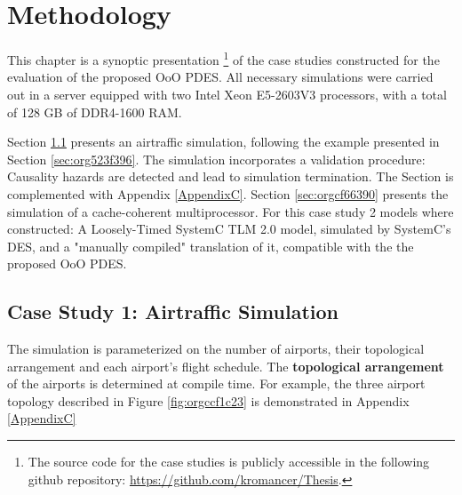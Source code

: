 \documentclass[11pt]{article}
\begin{document}
\clearpage

\section{Methodology}
\label{sec:orgbabcb65}
This chapter is a synoptic presentation \footnote{The source code for the case studies is publicly accessible in the following github repository: \url{https://github.com/kromancer/Thesis}.} of the case studies constructed for the evaluation of the proposed OoO PDES.
All necessary simulations were carried out in a server equipped with two Intel Xeon E5-2603V3 processors, with a total of 128 GB of DDR4-1600 RAM.

Section \ref{sec:orgd224066} presents an airtraffic simulation, following the example presented in Section \ref{sec:org523f396}.
The simulation incorporates a validation procedure: Causality hazards are detected and lead to simulation termination.
The Section is complemented with Appendix \ref{AppendixC}.
Section \ref{sec:orgcf66390} presents the simulation of a cache-coherent multiprocessor.
For this case study 2 models where constructed: A Loosely-Timed SystemC TLM 2.0 model, simulated by SystemC's DES, 
and a "manually compiled" translation of it, compatible with the the proposed OoO PDES.

\subsection{Case Study 1: Airtraffic Simulation}
\label{sec:orgd224066}
The simulation is parameterized on the number of airports, their topological arrangement and each airport's flight schedule.
The \textbf{topological arrangement} of the airports is determined at compile time.
For example, the three airport topology described in Figure \ref{fig:orgccf1c23} is demonstrated in Appendix \ref{AppendixC}
\end{document}
